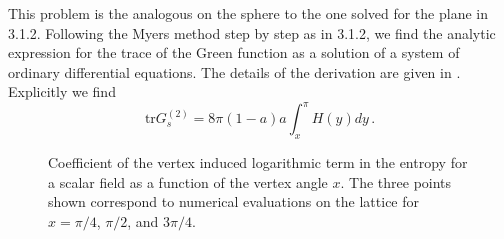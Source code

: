 \documentclass[a4paper]{article}
\begin{document}
 This problem is the analogous on the sphere to the one solved for the plane in 3.1.2.
 Following the Myers method step by step as in 3.1.2,  we find the analytic expression for the trace of the Green function as a solution of a system of ordinary differential equations. The details of the derivation are given in \cite{log}. Explicitly we find   
\begin{equation}
\textrm{tr}G_s^{(2)}=8\pi (1-a)a\int_{x}^{\pi}H(y)dy\,.\label{quince}
\end{equation}

 \begin{figure} [tb]
\centering
\leavevmode
\epsfysize=5.3cm
\bigskip
{}
\caption{Coefficient of the vertex induced logarithmic term in the entropy for a scalar field as a function of the vertex angle $x$. The three points shown correspond to numerical evaluations on the lattice for $x=\pi/4$, $\pi/2$, and $3 \pi/4$.}
\label{ryry}
\end{figure}
 
\end{document}
